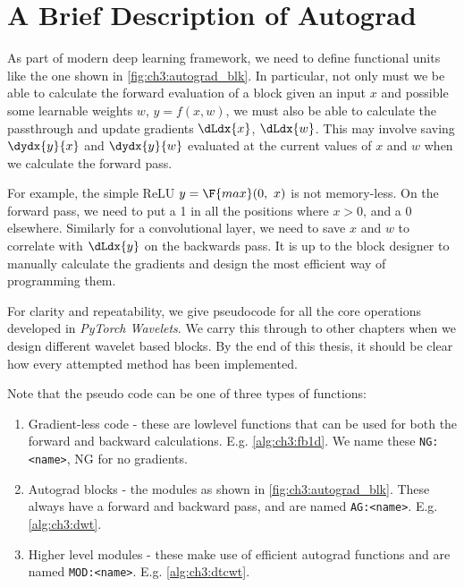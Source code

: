 \section{A Brief Description of Autograd}
As part of modern deep learning framework, we need to define functional units like 
the one shown in \autoref{fig:ch3:autograd_blk}. In particular, not only must we
be able to calculate the forward evaluation of a block given an input $x$ and 
possible some learnable weights $w$, $y=f(x,w)$, we must also be able to
calculate the passthrough and update gradients $\dLdx{x}$, $\dLdx{w}$. This may
involve saving $\dydx{y}{x}$ and $\dydx{y}{w}$ evaluated at the current
values of $x$ and $w$ when we calculate the forward pass. 

For example, the simple ReLU $y = \F{max}(0,\ x)$ is not memory-less. On the
forward pass, we need to put a 1 in all the positions where $x > 0$, and a 0
elsewhere. Similarly for a convolutional layer, we need to save $x$ and $w$ to
correlate with $\dLdx{y}$ on the backwards pass. It is up to the block designer
to manually calculate the gradients and design the most efficient way of
programming them.

For clarity and repeatability, we give pseudocode for all the core operations
developed in \emph{PyTorch Wavelets}. We carry this through to other chapters
when we design different wavelet based blocks. By the end of this thesis, it should be
clear how every attempted method has been implemented.


Note that the pseudo code can be one of three types of functions:
\begin{enumerate}
  \item Gradient-less code - these are lowlevel functions that can be used for
    both the forward and backward calculations. E.g. \autoref{alg:ch3:fb1d}. We
    name these \texttt{NG:<name>}, NG for no gradients.
  \item Autograd blocks - the modules as shown in
    \autoref{fig:ch3:autograd_blk}. These always have a forward and backward pass, and 
    are named \texttt{AG:<name>}. E.g. \autoref{alg:ch3:dwt}.
  \item Higher level modules - these make use of efficient autograd functions
    and are named \texttt{MOD:<name>}. E.g. \autoref{alg:ch3:dtcwt}.
\end{enumerate}


